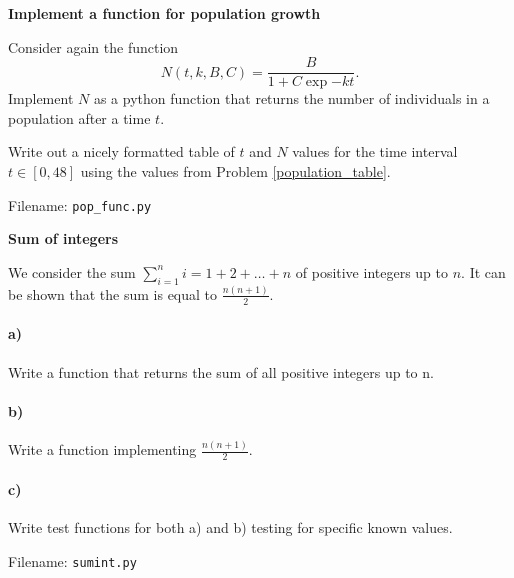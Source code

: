 
\begin{Problem}{\textbf{Implement a function for population growth}}

\noindent Consider again the function
\begin{equation*}
N(t, k, B, C) = \frac{B}{1 + C \exp{-kt}}.
\end{equation*}
Implement $N$ as a python function 
that returns the number of individuals in a population after a time $t$.

Write out a nicely formatted table of $t$ and $N$ values for the time interval
$t \in [0, 48]$ using the values from Problem \ref{population_table}.

Filename: \texttt{pop\_func.py}
\end{Problem}


\begin{Problem}{\textbf{Sum of integers}}

\noindent We consider the sum $\sum_{i = 1}^n i=1+2+\dots+n$ of positive integers up to $n$.
It can be shown that the sum is equal to $\frac{n(n+1)}{2}$.

\paragraph{a)}
Write a function  that returns the sum of all positive
integers up to n.

\paragraph{b)}
Write a function implementing $\frac{n(n+1)}{2}$.

\paragraph{c)}
Write test functions for both a) and b) testing for specific known values.

Filename: \texttt{sumint.py}
\end{Problem}
	

